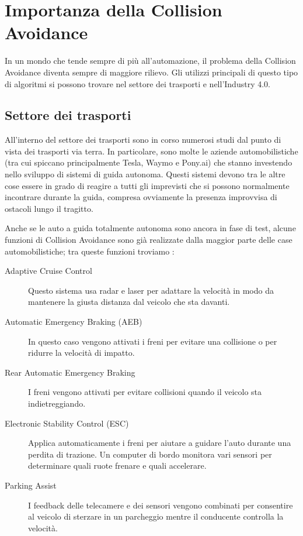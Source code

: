 \documentclass[Lau, binding=0.6cm, oneside]{sapthesis}
\begin{document}
\section{Importanza della Collision Avoidance}
In un mondo che tende sempre di più all'automazione, il problema della Collision Avoidance diventa sempre di maggiore rilievo.
Gli utilizzi principali di questo tipo di algoritmi si possono trovare nel settore dei trasporti e nell'Industry 4.0.

\subsection{Settore dei trasporti}
All'interno del settore dei trasporti sono in corso numerosi studi dal punto di vista dei trasporti via terra.
In particolare, sono molte le aziende automobilistiche (tra cui spiccano principalmente Tesla, Waymo e Pony.ai) che stanno investendo nello sviluppo di sistemi di guida autonoma.
Questi sistemi devono tra le altre cose essere in grado di reagire a tutti gli imprevisti che si possono normalmente incontrare durante la guida, compresa ovviamente la presenza improvvisa di ostacoli lungo il tragitto.

Anche se le auto a guida totalmente autonoma sono ancora in fase di test, alcune funzioni di Collision Avoidance sono già realizzate dalla maggior parte delle case automobilistiche; tra queste funzioni troviamo \cite{fonte8}:
\begin{description}
	\item[Adaptive Cruise Control] Questo sistema usa radar e laser per adattare la velocità in modo da mantenere la giusta distanza dal veicolo che sta davanti.
	\item[Automatic Emergency Braking (AEB)] In questo caso vengono attivati i freni per evitare una collisione o per ridurre la velocità di impatto.
	\item[Rear Automatic Emergency Braking] I freni vengono attivati per evitare collisioni quando il veicolo sta indietreggiando.
	\item[Electronic Stability Control (ESC)] Applica automaticamente i freni per aiutare a guidare l'auto durante una perdita di trazione. Un computer di bordo monitora vari sensori per determinare quali ruote frenare e quali accelerare.
	\item[Parking Assist] I feedback delle telecamere e dei sensori vengono combinati per consentire al veicolo di sterzare in un parcheggio mentre il conducente controlla la velocità.
\end{description} 
\end{document}

